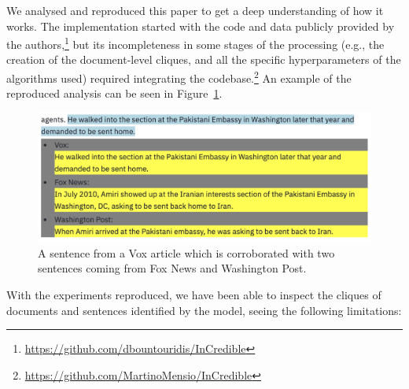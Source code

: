 We analysed and reproduced this paper to get a deep understanding of how it works. The implementation started with the code and data publicly provided by the authors,\footnote{\url{https://github.com/dbountouridis/InCredible}} but its incompleteness in some stages of the processing (e.g., the creation of the document-level cliques, and all the specific hyperparameters of the algorithms used) required integrating the codebase.\footnote{\url{https://github.com/MartinoMensio/InCredible}}
An example of the reproduced analysis can be seen in Figure~\ref{fig:cluster_similar_sentences_amiri}.

\begin{figure}[!htbp]
    \centering
    \includegraphics[width=\linewidth]{figures/cluster_similar_sentences_amiri.png}
    \caption{A sentence from a Vox article which is corroborated with two sentences coming from Fox News and Washington Post.}
    \label{fig:cluster_similar_sentences_amiri}
\end{figure}

With the experiments reproduced, we have been able to inspect the cliques of documents and sentences identified by the model, seeing the following limitations:

